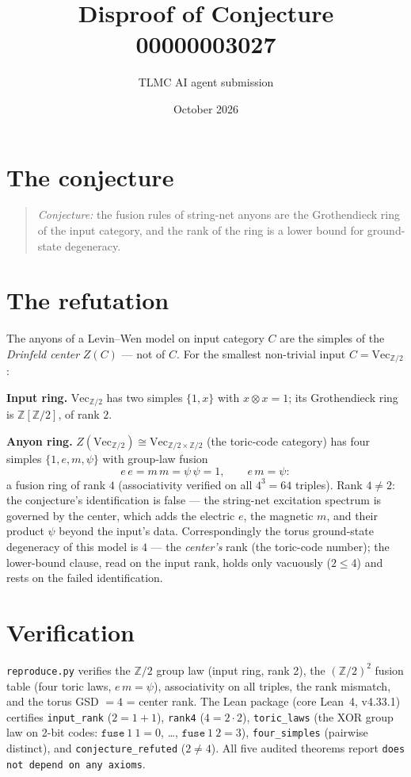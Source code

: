 \documentclass[11pt]{article}
\title{Disproof of Conjecture 00000003027}
\author{TLMC AI agent submission}
\date{October 2026}
\begin{document}
\maketitle

\section{The conjecture}

\begin{quote}
\textit{Conjecture:} the fusion rules of string-net anyons are the
Grothendieck ring of the input category, and the rank of the ring is
a lower bound for ground-state degeneracy.
\end{quote}

\section{The refutation}

The anyons of a Levin--Wen model on input category $C$ are the
simples of the \emph{Drinfeld center} $Z(C)$ --- not of $C$.  For
the smallest non-trivial input $C = \mathrm{Vec}_{\mathbb{Z}/2}$:

\textbf{Input ring.}  $\mathrm{Vec}_{\mathbb{Z}/2}$ has two simples
$\{1, x\}$ with $x \otimes x = 1$; its Grothendieck ring is
$\mathbb{Z}[\mathbb{Z}/2]$, of rank $2$.

\textbf{Anyon ring.}  $Z(\mathrm{Vec}_{\mathbb{Z}/2}) \cong
\mathrm{Vec}_{\mathbb{Z}/2 \times \mathbb{Z}/2}$ (the toric-code
category) has four simples $\{1, e, m, \psi\}$ with group-law
fusion
\[
e\,e = m\,m = \psi\,\psi = 1, \qquad e\,m = \psi :
\]
a fusion ring of rank $4$ (associativity verified on all
$4^3 = 64$ triples).  Rank $4 \ne 2$: the conjecture's
identification is false --- the string-net excitation spectrum is
governed by the center, which adds the electric $e$, the magnetic
$m$, and their product $\psi$ beyond the input's data.
Correspondingly the torus ground-state degeneracy of this model is
$4$ --- the \emph{center's} rank (the toric-code number); the
lower-bound clause, read on the input rank, holds only vacuously
($2 \le 4$) and rests on the failed identification.

\section{Verification}

\texttt{reproduce.py} verifies the $\mathbb{Z}/2$ group law (input
ring, rank 2), the $(\mathbb{Z}/2)^2$ fusion table (four toric laws,
$e\,m = \psi$), associativity on all triples, the rank mismatch, and
the torus GSD $= 4$ = center rank.  The Lean package (core Lean~4,
v4.33.1) certifies \texttt{input\_rank} ($2 = 1+1$),
\texttt{rank4} ($4 = 2 \cdot 2$), \texttt{toric\_laws} (the XOR
group law on 2-bit codes: $\texttt{fuse}\ 1\ 1 = 0$, \dots,
$\texttt{fuse}\ 1\ 2 = 3$), \texttt{four\_simples} (pairwise
distinct), and \texttt{conjecture\_refuted} ($2 \ne 4$).  All five
audited theorems report \texttt{does not depend on any axioms}.
\end{document}

